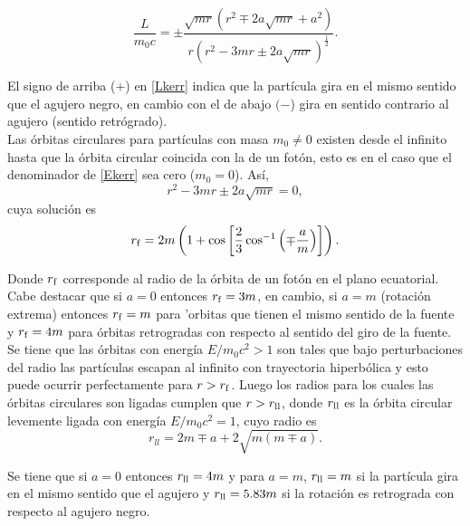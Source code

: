 \begin{equation}
\frac{L}{m_0c}=\pm\frac{\sqrt{mr}\left(r^2\mp 2a\sqrt{mr}+a^2 \right)}{r\left(r^2-3mr\pm 2a\sqrt{mr}\right)^{\frac{1}{2}}} .\label{Lkerr} 
\end{equation}

El signo de arriba ($+$) en \eqref{Lkerr} indica que la part\'icula gira en el mismo sentido que el agujero negro, en cambio con el de abajo $(-$) gira en sentido contrario al agujero (sentido retr\'ogrado).\\

Las \'orbitas circulares para part\'iculas con masa $m_0\neq 0$ existen desde el infinito hasta que la \'orbita circular coincida con la de un fot\'on, esto es en el caso que el denominador de \eqref{Ekerr} sea cero ($m_0=0$). As\'i,
\begin{equation}
r^2-3mr\pm 2a\sqrt{mr}=0,
\end{equation}
cuya soluci\'on es
\begin{equation}\label{phorbit}
r_{\rm f}=2m\left(1+\cos\left[\frac{2}{3}\cos^{-1}\left(\mp \frac{a}{m} \right) \right] \right).
\end{equation}

Donde $r_{\rm f}$ corresponde al radio de la \'orbita de un fot\'on en el plano ecuatorial. Cabe destacar que si $a=0$ entonces $r_{\rm f}=3m$, en cambio, si $a=m$ (rotaci\'on extrema) entonces $r_{\rm f}=m$ para 'orbitas que tienen el mismo sentido de la fuente y $r_{\rm f}=4m$ para \'orbitas retrogradas con respecto al sentido del giro de la fuente.\\

Se tiene que las \'orbitas con energ\'ia $E/m_0c^2>1$ son tales que bajo perturbaciones del radio las part\'iculas escapan al infinito con trayectoria hiperb\'olica y esto puede ocurrir perfectamente para $r>r_{\rm f}$. Luego los radios para los cuales las \'orbitas circulares son ligadas cumplen que $r>r_{\rm ll}$, donde $r_{\rm ll}$ es la \'orbita circular levemente ligada con energ\'ia $E/m_0c^2=1$, cuyo radio es
\begin{equation}\label{mborbit}
r_{ll}=2m\mp a+2\sqrt{m\left(m\mp a \right)}.
\end{equation}

Se tiene que si $a=0$ entonces $r_{\rm ll}=4m$ y para $a=m$, $r_{\rm ll}=m$ si la part\'icula gira en el mismo sentido que el agujero y $r_{\rm ll}=5.83m$ si la rotaci\'on es retrograda con respecto al agujero negro.\\

